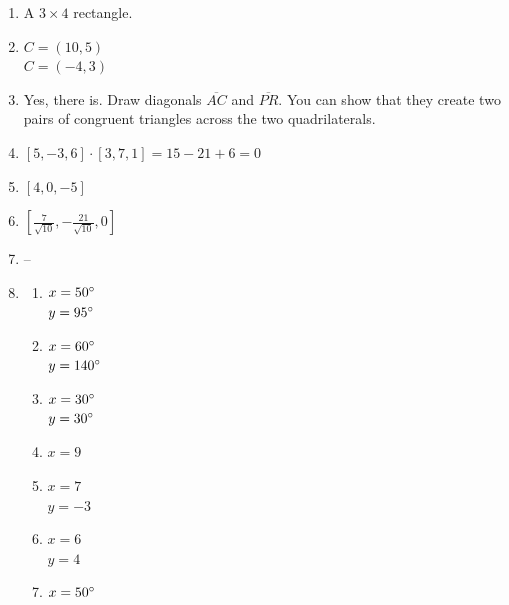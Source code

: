 \documentclass{article}
\begin{document}
\begin{enumerate}
\begin{enumerate}
	\item $\overrightarrow{PS} = [c, d]$ \\
		$\overrightarrow{PQ} = [a, b]$
		
	\item $R = (a + c, b + d)$
	
	\end{enumerate}
	
\item A $3 \times 4$ rectangle.

\item $C = (10, 5)$ \\
	$C = (-4, 3)$
	
\item Yes, there is. Draw diagonals $\overline{AC}$ and $\overline{PR}$. You can show that they create two pairs of congruent triangles across the two quadrilaterals.

\item $[5, -3, 6] \cdot [3, 7, 1] = 15 - 21 + 6 = 0$

\item $[4, 0, -5]$

\item $\left[ \frac{7}{\sqrt{10}}, -\frac{21}{\sqrt{10}}, 0 \right]$

\item --

\item

	\begin{enumerate}
	
	\item $x = 50 \degree$ \\
		$y = 95 \degree$
		
	\item $x = 60 \degree$ \\
		$y = 140 \degree$
		
	\item $x = 30 \degree$ \\
		$y = 30 \degree$
		
	\item $x = 9$
	
	\item $x = 7$ \\
		$y = -3$
		
	\item $x = 6$ \\
		$y = 4$
		
	\item $x = 50 \degree$
	

\end{enumerate}
\end{enumerate}
\end{document}
